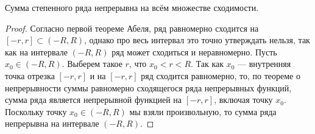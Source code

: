 \documentclass[a4paper, 12pt]{article}
\begin{document}
\begin{Consequence}
Сумма степенного ряда непрерывна на всём множестве сходимости.
\end{Consequence}

\begin{proof}
Согласно первой теореме Абеля, ряд равномерно сходится на $\left [ -r,r \right ] \subset \left ( -R, R \right )$, однако про весь интервал это точно утверждать нельзя, так как на интервале $\left ( -R, R \right )$ ряд может сходиться и неравномерно. Пусть $x_{0}\in\left ( -R, R \right )$. Выберем такое $r$, что $x_{0}<r<R$. Так как $x_{0}$ --- внутренняя точка отрезка $\left [ -r, r \right ]$ и на $\left [ -r, r \right ]$ ряд  сходится равномерно, то, по теореме о непрерывности суммы равномерно сходящегося ряда непрерывных функций, сумма ряда является непрерывной функцией на $\left [ -r,r \right ]$, включая точку $x_{0}$.
Поскольку точку $x_{0}\in\left ( -R, R \right )$ мы взяли произвольную, то сумма ряда непрерывна на интервале $\left ( -R, R \right )$.



\end{proof}
\end{document}

